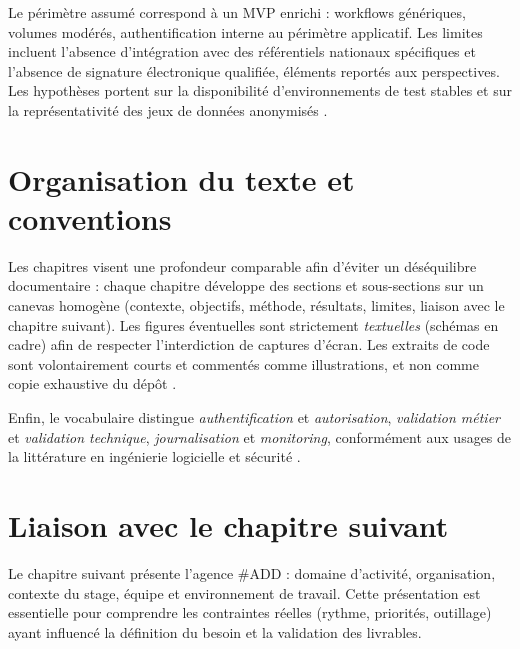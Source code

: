 Le périmètre assumé correspond à un MVP enrichi : workflows génériques, volumes modérés, authentification interne au périmètre applicatif. Les limites incluent l'absence d'intégration avec des référentiels nationaux spécifiques et l'absence de signature électronique qualifiée, éléments reportés aux perspectives. Les hypothèses portent sur la disponibilité d'environnements de test stables et sur la représentativité des jeux de données anonymisés \cite{pressman2014}.

\section{Organisation du texte et conventions}

Les chapitres visent une profondeur comparable afin d'éviter un déséquilibre documentaire : chaque chapitre développe des sections et sous-sections sur un canevas homogène (contexte, objectifs, méthode, résultats, limites, liaison avec le chapitre suivant). Les figures éventuelles sont strictement \emph{textuelles} (schémas en cadre) afin de respecter l'interdiction de captures d'écran. Les extraits de code sont volontairement courts et commentés comme illustrations, et non comme copie exhaustive du dépôt \cite{sommerville2016}.

Enfin, le vocabulaire distingue \emph{authentification} et \emph{autorisation}, \emph{validation métier} et \emph{validation technique}, \emph{journalisation} et \emph{monitoring}, conformément aux usages de la littérature en ingénierie logicielle et sécurité \cite{owasp2021,iso25010}.

\section{Liaison avec le chapitre suivant}

Le chapitre suivant présente l'agence \#ADD : domaine d'activité, organisation, contexte du stage, équipe et environnement de travail. Cette présentation est essentielle pour comprendre les contraintes réelles (rythme, priorités, outillage) ayant influencé la définition du besoin et la validation des livrables.
